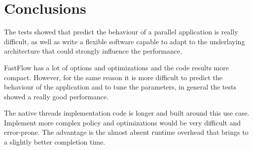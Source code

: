 \documentclass[12pt, letterpaper]{article}
\begin{document}
\FloatBarrier
\section{Conclusions}
The tests showed that predict the behaviour of a parallel application is really difficult, as well as write a flexible software capable to adapt to the underlaying architecture that could strongly influence the performance. 

FastFlow has a lot of options and optimizations and the code results more compact. However, for the same reason it is more difficult to predict the behaviour of the application and to tune the parameters, in general the tests showed a really good performance.

The native threads implementation code is longer and built around this use case. Implement more complex policy and optimizations would be very difficult and error-prone. The advantage is the almost absent runtime overhead that brings to a slightly better completion time.




% 
% 
\end{document}
